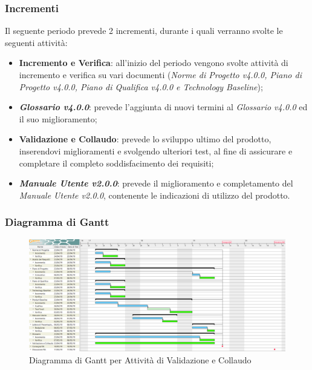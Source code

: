 \subsubsection{Incrementi}
Il seguente periodo prevede 2 incrementi, durante i quali verranno svolte le seguenti attività:
\begin{itemize}
	\item \textbf{Incremento e Verifica}: all'inizio del periodo vengono svolte attività di incremento e verifica su vari documenti (\textit{Norme di Progetto v4.0.0, Piano di Progetto v4.0.0, Piano di Qualifica v4.0.0 e Technology Baseline});
	\item \textbf{\textit{Glossario v4.0.0}}: prevede l'aggiunta di nuovi termini al \textit{Glossario v4.0.0} ed il suo miglioramento;
	\item \textbf{Validazione e Collaudo}: prevede lo sviluppo ultimo del prodotto, inserendovi miglioramenti e svolgendo ulteriori test, al fine di assicurare e completare il completo soddisfacimento dei requisiti;
	\item \textbf{\textit{Manuale Utente v2.0.0}}: prevede il miglioramento e completamento del \textit{Manuale Utente v2.0.0}, contenente le indicazioni di utilizzo del prodotto.
\end{itemize}

\begin{landscape}
\subsubsection{Diagramma di Gantt}
\begin{figure}[H]
	\centering
  		\includegraphics[width=1.0\linewidth]{./images/ValidazioneeCollaudo.png}
  		\caption{Diagramma di Gantt per Attività di Validazione e Collaudo}
  		\label{fig:Gantt Validazione e Collaudo}
\end{figure}
\end{landscape}